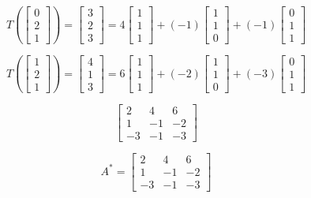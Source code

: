 \documentclass{report}
\begin{document}
$$
T \left( \begin{bmatrix} 0 \\ 2 \\ 1 \end{bmatrix} \right) = \begin{bmatrix} 3 \\ 2 \\ 3 \end{bmatrix} = 4 \begin{bmatrix} 1 \\ 1 \\ 1 \end{bmatrix} + (-1) \begin{bmatrix} 1 \\ 1 \\ 0 \end{bmatrix} + (-1) \begin{bmatrix} 0 \\ 1 \\ 1 \end{bmatrix}
$$

$$
T \left( \begin{bmatrix} 1 \\ 2 \\ 1 \end{bmatrix} \right) = \begin{bmatrix} 4 \\ 1 \\ 3 \end{bmatrix} = 6 \begin{bmatrix} 1 \\ 1 \\ 1 \end{bmatrix} + (-2) \begin{bmatrix} 1 \\ 1 \\ 0 \end{bmatrix} + (-3) \begin{bmatrix} 0 \\ 1 \\ 1 \end{bmatrix} 
$$

$$
\begin{bmatrix} 2 & 4 & 6 \\ 1 & -1 & -2 \\ -3 & -1 & -3 \end{bmatrix} 
$$

$$
A^{*} = \begin{bmatrix} 2 & 4 & 6 \\ 1 & -1 & -2 \\ -3 & -1 & -3 \end{bmatrix} 
$$
\end{document}
